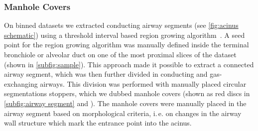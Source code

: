 \documentclass[%
	draft=true,
	paper=a4,%
	twoside=true,%
	abstract=true]{scrartcl}
\newcommand{\ie}{i.\,e.\xspace}
\begin{document}
\subsubsection{Manhole Covers}\label{sec:manhole covers}
On binned datasets we extracted conducting airway segments (see \autoref{fig:acinus schematic}) using a threshold interval based region growing algorithm~\cite{Zucker1976}. A seed point for the region growing algorithm was manually defined inside the terminal bronchiole or alveolar duct on one of the most proximal slices of the dataset (shown in \autoref{subfig:sample}). This approach made it possible to extract a connected airway segment, which was then further divided in conducting and gas-exchanging airways. This division was performed with manually placed circular segmentations stoppers, which we dubbed manhole covers (shown as red discs in \autoref{subfig:airway segment} and ). The manhole covers were manually placed in the airway segment based on morphological criteria, \ie on changes in the airway wall structure which mark the entrance point into the acinus.
\end{document}
